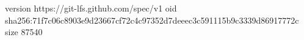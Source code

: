 version https://git-lfs.github.com/spec/v1
oid sha256:71f7c06c8903e9d23667cf72c4c97352d7deeec3c591115b9c3339d86917772c
size 87540
